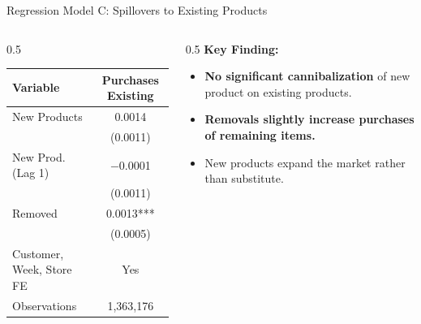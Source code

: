 \documentclass[aspectratio=169]{beamer}  %
\begin{document}
\begin{frame}{Regression Model C: Spillovers to Existing Products}
    \begin{columns}[T]
        \begin{column}{0.5\textwidth}
            \begin{table}
            \centering
            \scriptsize
            \begin{tabular}{lc}
            \toprule
            \textbf{Variable} & \textbf{Purchases Existing} \\
            \midrule
            New Products & 0.0014 \\
             & (0.0011) \\
            New Prod. (Lag 1) & $-$0.0001 \\
             & (0.0011) \\
            Removed & 0.0013*** \\
             & (0.0005) \\
            \midrule
            Customer, Week, Store FE & Yes \\
            Observations & 1,363,176 \\
            \bottomrule
            \end{tabular}
            \end{table}
        \end{column}
        
        \begin{column}{0.5\textwidth}
            \textbf{Key Finding:}
            \begin{itemize}
                \item \textbf{No significant cannibalization} of new product on existing products.
                \item \textbf{Removals slightly increase purchases of remaining items.}
                \item New products expand the market rather than substitute.
            \end{itemize}
        \end{column}
    \end{columns}
\end{frame}
\end{document}
